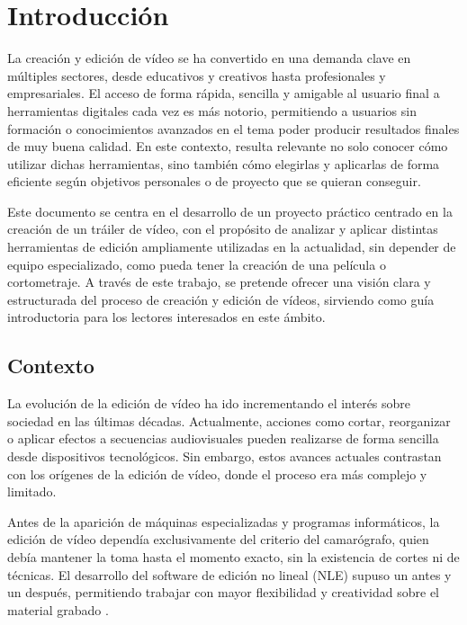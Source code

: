 \section{Introducción}

La creación y edición de vídeo se ha convertido en una demanda clave en múltiples sectores, 
desde educativos y creativos hasta profesionales y empresariales. 
El acceso de forma rápida, sencilla y amigable al usuario final a herramientas digitales 
cada vez es más notorio, permitiendo a usuarios sin formación o conocimientos avanzados en 
el tema poder producir resultados finales de muy buena calidad. 
En este contexto, resulta relevante no solo conocer cómo utilizar dichas herramientas, 
sino también cómo elegirlas y aplicarlas de forma eficiente según objetivos personales 
o de proyecto que se quieran conseguir.


Este documento se centra en el desarrollo de un proyecto práctico centrado 
en la creación de un tráiler de vídeo, con el propósito de analizar y aplicar 
distintas herramientas de edición ampliamente utilizadas en la actualidad, 
sin depender de equipo especializado, como pueda tener la creación de una película o cortometraje. A través de este trabajo, se pretende ofrecer una visión clara y estructurada del proceso de creación y edición de vídeos, sirviendo como guía introductoria para los lectores interesados en este ámbito.

\subsection{Contexto}

La evolución de la edición de vídeo ha ido incrementando el interés sobre sociedad 
en las últimas décadas. Actualmente, acciones como cortar, reorganizar o 
aplicar efectos a secuencias audiovisuales pueden realizarse de forma sencilla 
desde dispositivos tecnológicos. Sin embargo, estos avances actuales contrastan con 
los orígenes de la edición de vídeo, donde el proceso era más complejo y limitado.

Antes de la aparición de máquinas especializadas y programas informáticos, 
la edición de vídeo dependía exclusivamente del criterio del camarógrafo, 
quien debía mantener la toma hasta el momento exacto, sin la existencia de cortes ni de técnicas. 
El desarrollo del software de edición no lineal (NLE) supuso un antes y un después, 
permitiendo trabajar con mayor flexibilidad y creatividad sobre el material grabado \cite{NLE}.

